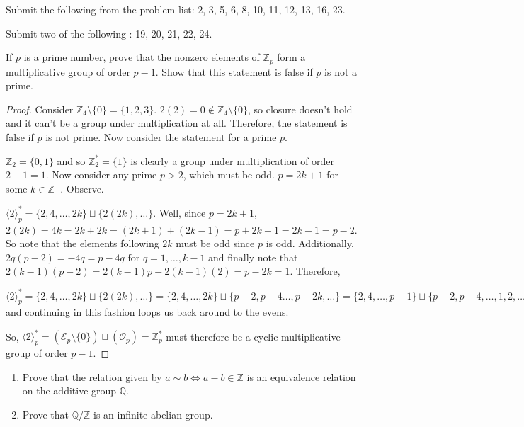 \documentclass[addpoints,10pt]{exam}
\theoremstyle{plain}
\theoremstyle{definition}
\newtheorem{prob}[thm]{Problem}
\theoremstyle{plain}
\theoremstyle{plain}
\theoremstyle{definition}
\let\oldprob\prob
\let\endoldprob\endprob
\renewenvironment{prob}
  {\begin{singlespace}\oldprob}
  {\endoldprob\end{singlespace}}
\newcommand{\belowtitle}{\leavevmode\newline}
\newcommand{\ZZ}{\ensuremath{\mathbb{Z}}}
\begin{document}
Submit the following from the problem list: 2, 3, 5, 6, 8, 10, 11, 12, 13, 16, 23.

Submit two of the following : 19, 20, 21, 22, 24.

\begin{prob}
  If $p$ is a prime number, prove that the nonzero elements of $\mathbb{Z}_p$ form a multiplicative group of order $p-1$. Show that this statement is false if $p$ is not a prime.
\end{prob}

    \begin{proof} Consider $\ZZ_{4}\setminus\{0\}=\{1,2,3\}$. $2(2)=0\not\in \ZZ_{4}\setminus\{0\}$, so closure doesn't hold and it can't be a group under multiplication at all. Therefore, the statement is false if $p$ is not prime. Now consider the statement for a prime $p$.
        
    $\ZZ_{2}=\{0,1\}$ and so $\ZZ^{*}_{2}=\{1\}$ is clearly a group under multiplication of order $2-1=1$. Now consider any prime $p>2$, which must be odd. $p=2k+1$ for some $k\in \ZZ^{+}$. Observe.

    $\langle 2\rangle^{*}_{p}=\{2,4,\hdots, 2k\}\sqcup \{2(2k),\hdots\}$. Well, since $p=2k+1$, $2(2k)=4k=2k+2k=(2k+1)+(2k-1)=p+2k-1=2k-1=p-2$. So note that the elements following $2k$ must be odd since $p$ is odd. Additionally, $2q(p-2)=-4q=p-4q$ for $q=1,\hdots, k-1$ and finally note that $2(k-1)(p-2)=2(k-1)p-2(k-1)(2)=p-2k=1$. Therefore,

    $\langle 2\rangle^{*}_{p}=\{2,4,\hdots, 2k\}\sqcup \{2(2k),\hdots\}=\{2,4,\hdots, 2k\}\sqcup \{p-2,p-4\hdots,p-2k,\hdots\}=\{2,4,\hdots,p-1\}\sqcup \{p-2,p-4,\hdots,1,2,\hdots\}$ and continuing in this fashion loops us back around to the evens.

    So, $\langle 2\rangle^{*}_{p}=(\mathcal{E}_{p}\setminus\{0\})\sqcup (\mathcal{O}_{p})=\ZZ^{*}_{p}$ must therefore be a cyclic multiplicative group of order $p-1$.

\end{proof}
\newpage
\begin{prob}\belowtitle
  \begin{enumerate}[label=(\alph*)]
    \item Prove that the relation given by $a \sim b \iff a - b \in \mathbb{Z}$ is an equivalence relation on the additive group $\mathbb{Q}$.
    \item Prove that $\mathbb{Q}/\mathbb{Z}$ is an infinite abelian group.
  \end{enumerate}
\end{prob}
\end{document}

